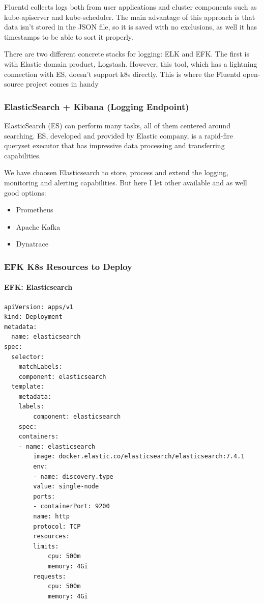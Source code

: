 \documentclass{article}
\newenvironment{codetemplate}[1][]{%
  \mybasecolorbox[#1]
  \itshape
}{%
  \endmybasecolorbox
}
\begin{document}
Fluentd collects logs both from user applications and cluster components such as kube-apiserver and kube-scheduler.
The main advantage of this approach is that data isn’t stored in the JSON file, so it is saved with no exclusions, as well it has timestamps to be able to sort it properly.

There are two different concrete stacks for logging: ELK and EFK. The first is with Elastic domain product, Logstash. However, this tool, which has a lightning connection with ES, doesn’t support k8s directly. This is where the Fluentd open-source project comes in handy

\subsubsection{ElasticSearch + Kibana (Logging Endpoint)}

ElasticSearch (ES) can perform many tasks, all of them centered around searching. ES, developed and provided by Elastic company, is a rapid-fire queryset executor that has impressive data processing and transferring capabilities.

We have choosen Elasticsearch to store, process and extend the logging, monitoring and alerting capabilities. But here I let other available and as well good options:
\begin{itemize}
    \item Prometheus
    \item Apache Kafka
    \item Dynatrace
\end{itemize}

\subsubsection{EFK K8s Resources to Deploy}

\paragraph{EFK: Elasticsearch}
\begin{codetemplate}{}
\begin{verbatim}
apiVersion: apps/v1
kind: Deployment
metadata:
  name: elasticsearch
spec:
  selector:
	matchLabels:
  	component: elasticsearch
  template:
	metadata:
  	labels:
    	component: elasticsearch
	spec:
  	containers:
  	- name: elasticsearch
    	image: docker.elastic.co/elasticsearch/elasticsearch:7.4.1
    	env:
    	- name: discovery.type
      	value: single-node
    	ports:
    	- containerPort: 9200
      	name: http
      	protocol: TCP
    	resources:
      	limits:
        	cpu: 500m
        	memory: 4Gi
      	requests:
        	cpu: 500m
        	memory: 4Gi
\end{verbatim}
\end{codetemplate}
\end{document}
